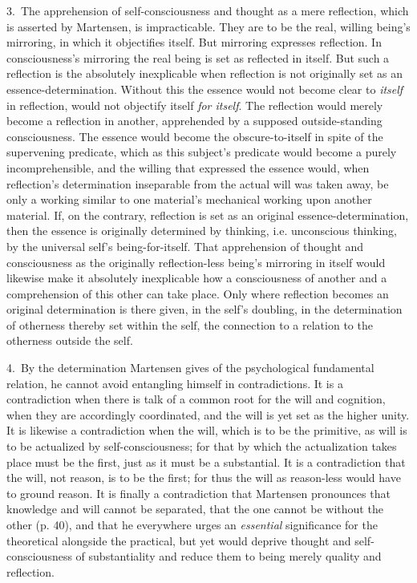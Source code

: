 \documentclass[12pt,a4paper]{book}
\begin{document}
3.~The apprehension of self-consciousness and thought as a mere reflection, which
is asserted by Martensen, is impracticable. They are to be the real, willing
being's mirroring, in which it objectifies itself. But mirroring expresses
reflection. In consciousness's mirroring the real being is set as reflected in
itself. But such a reflection is the absolutely inexplicable when reflection is not
originally set as an essence-determination. Without this the essence would not
become clear to \emph{itself} in reflection, would not objectify itself \emph{for itself}. The
reflection would merely become a reflection in another, apprehended by a supposed
outside-standing consciousness. The essence would become the obscure-to-itself in
spite of the supervening predicate, which as this subject's predicate would become
a purely incomprehensible, and the willing that expressed the essence would, when
reflection's determination inseparable from the actual will was taken away, be only
a working similar to one material's mechanical working upon another material. If, on
the contrary, reflection is set as an original essence-determination, then the
essence is originally determined by thinking, i.e. unconscious thinking, by the
universal self's being-for-itself. That apprehension of thought and consciousness
as the originally reflection-less being's mirroring in itself would likewise make it
absolutely inexplicable how a consciousness of another and a comprehension of this
other can take place. Only where reflection becomes an original determination is
there given, in the self's doubling, in the determination of otherness thereby set
within the self, the connection to a relation to the otherness outside the self.

4.~By the determination Martensen gives of the psychological fundamental relation,
he cannot avoid entangling himself in contradictions. It is a contradiction when
there is talk of a common root for the will and cognition, when they are accordingly
coordinated, and the will is yet set as the higher unity. It is likewise a
contradiction when the will, which is to be the primitive, as will is to be
actualized by self-consciousness; for that by which the actualization takes place
must be the first, just as it must be a substantial. It is a contradiction that the
will, not reason, is to be the first; for thus the will as reason-less would have to
ground reason. It is finally a contradiction that Martensen pronounces that
knowledge and will cannot be separated, that the one cannot be without the other (p.
40), and that he everywhere urges an \emph{essential} significance for the
theoretical alongside the practical, but yet would deprive thought and
self-consciousness of substantiality and reduce them to being merely quality and
reflection.
\end{document}
